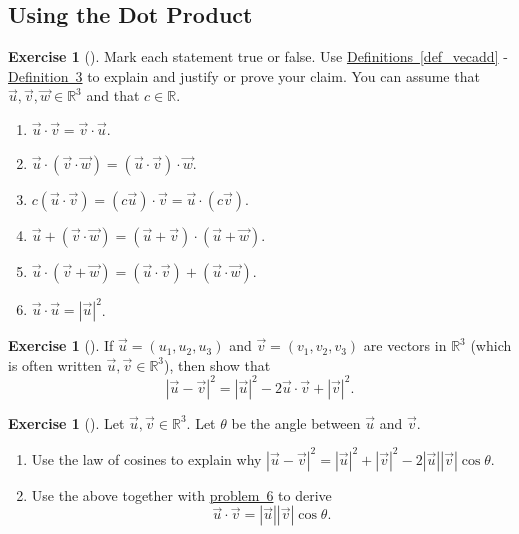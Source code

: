 \documentclass[10pt,]{book}
\theoremstyle{plain}
\theoremstyle{definition}
\theoremstyle{definition}
\theoremstyle{definition}
\theoremstyle{definition}
\newtheorem{exploration}[project]{Exercise}
\theoremstyle{definition}
\numberwithin{equation}{section}
\begin{document}
\subsection[{Using the Dot Product}]{Using the Dot Product}\label{subsection-9}
\begin{exploration}[]\label{dot_product_facts}
Mark each statement true or false. Use \hyperref[def_vecadd]{Definitions~\ref{def_vecadd}} - \hyperref[def_orthogonal]{Definition~3} to explain and justify or prove your claim. You can assume that \(\vec u,\vec v,\vec w\in\mathbb{R}^3\) and that \(c\in\mathbb{R}\).%
\begin{enumerate}[font=\bfseries,label=(\alph*),ref=\alph*]
\item\label{task-62} \(\vec u\cdot \vec v=\vec v\cdot \vec u\).%
\item\label{task-63} \(\vec u\cdot (\vec v\cdot \vec w)=(\vec u\cdot\vec v)\cdot\vec w\).%
\item\label{task-64} \(c(\vec u\cdot \vec v)=(c\vec u)\cdot \vec v=\vec u\cdot (c\vec v)\).%
\item\label{task-65} \(\vec u+(\vec v\cdot \vec w)=(\vec u+\vec v)\cdot(\vec u+\vec w)\).%
\item\label{task-66} \(\vec u\cdot (\vec v+ \vec w)=(\vec u\cdot \vec v)+(\vec u\cdot\vec w)\).%
\item\label{task-67} \(\vec u\cdot \vec u= |\vec u|^2\).%
\end{enumerate}
\end{exploration}
\begin{exploration}[]\label{prob_dot_prep}
If \(\vec u = (u_1,u_2,u_3)\) and \(\vec v= (v_1,v_2,v_3)\) are vectors in \(\mathbb{R}^3\) (which is often written \(\vec u,\vec v\in\mathbb{R}^3\)), then show that%
\begin{equation*}
|\vec u-\vec v|^2 = |\vec u|^2-2\vec u\cdot \vec v +|\vec v|^2.
\end{equation*}
%
\end{exploration}
\begin{exploration}[]\label{prob_dot_angle_formula}
Let \(\vec u,\vec v\in\mathbb{R}^3\). Let \(\theta\) be the angle between \(\vec u\) and \(\vec v\).%
\begin{enumerate}[font=\bfseries,label=(\alph*),ref=\alph*]
\item\label{task-68} Use the law of cosines to explain why \(|\vec u-\vec v|^2=|\vec u|^2+|\vec v|^2-2|\vec u||\vec v|\cos\theta\).%
\item\label{task-69} Use the above together with \hyperref[prob_dot_prep]{problem~6} to derive%
\begin{equation*}
\vec u\cdot \vec v=|\vec u||\vec v|\cos\theta.
\end{equation*}
%
\end{enumerate}
\end{exploration}
\end{document}
